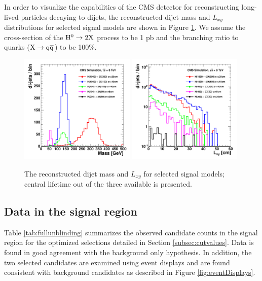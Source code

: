 In order to visualize the capabilities of the CMS detector for reconstructing long-lived particles decaying to 
dijets, 
the reconstructed dijet mass and $L_{xy}$ distributions for selected signal models are shown in Figure
\ref{fig:signal}. We assume the cross-section of the $\Higgs \to 2\X$ process to be 1 pb and the branching 
ratio to quarks ($\X \to \qq$) to be 100\%.

\begin{figure}[htbp]
\centering
\includegraphics[width=0.49\textwidth]{plots/signal/mass.pdf}
\includegraphics[width=0.49\textwidth]{plots/signal/Lxy.pdf}
\caption{The reconstructed dijet mass and $L_{xy}$ for selected signal models; central lifetime out of the three available is presented.\label{fig:signal}}
\end{figure}

\subsection{Data in the signal region}
\label{subsec:fullunblinding}

Table \ref{tab:fullunblinding} summarizes the observed candidate counts in the signal region for the optimized 
selections detailed in Section \ref{subsec:cutvalues}. Data is found in good agreement with the 
background only hypothesis. In addition, the two selected candidates are examined using event displays
and are found consistent with background candidates as described in Figure \ref{fig:eventDisplays}.  

